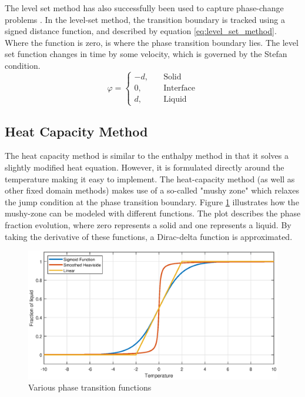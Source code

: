 The level set method has also successfully been used to capture phase-change problems \cite{Osher_Sethian_1988}. In the level-set method, the transition boundary is tracked using a signed distance function, and described by equation \ref{eq:level_set_method}. Where the function is zero, is where the phase transition boundary lies. The level set function changes in time by some velocity, which is governed by the Stefan condition.
\begin{equation}
    \varphi =\begin{cases}
        -d, \quad &\text{Solid} \\ 0, \quad &\text{Interface} \\ d, \quad &\text{Liquid}
    \end{cases}
    \label{eq:level_set_method}
\end{equation}

\subsection*{Heat Capacity Method}
The heat capacity method is similar to the enthalpy method in that it solves a slightly modified heat equation. However, it is formulated directly around the temperature making it easy to implement. The heat-capacity method (as well as other fixed domain methods) makes use of a so-called "mushy zone" which relaxes the jump condition at the phase transition boundary. Figure \ref{fig:mushy_zone} illustrates how the mushy-zone can be modeled with different functions. The plot describes the phase fraction evolution, where zero represents a solid and one represents a liquid. By taking the derivative of these functions, a Dirac-delta function is approximated.
\begin{figure}[ht]
    \centering
    \includegraphics[width=0.9\linewidth]{figures/chapter_3/MushyZone.eps}
    \caption{Various phase transition functions}
    \label{fig:mushy_zone}
\end{figure}

